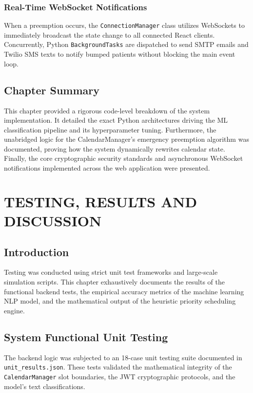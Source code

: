 \documentclass[12pt,a4paper]{report}
\begin{document}
\subsection{Real-Time WebSocket Notifications}
When a preemption occurs, the \texttt{ConnectionManager} class utilizes WebSockets to immediately broadcast the state change to all connected React clients. Concurrently, Python \texttt{BackgroundTasks} are dispatched to send SMTP emails and Twilio SMS texts to notify bumped patients without blocking the main event loop.

\section{Chapter Summary}
This chapter provided a rigorous code-level breakdown of the system implementation. It detailed the exact Python architectures driving the ML classification pipeline and its hyperparameter tuning. Furthermore, the unabridged logic for the CalendarManager's emergency preemption algorithm was documented, proving how the system dynamically rewrites calendar state. Finally, the core cryptographic security standards and asynchronous WebSocket notifications implemented across the web application were presented.

\chapter{TESTING, RESULTS AND DISCUSSION}

\section{Introduction}
Testing was conducted using strict unit test frameworks and large-scale simulation scripts. This chapter exhaustively documents the results of the functional backend tests, the empirical accuracy metrics of the machine learning NLP model, and the mathematical output of the heuristic priority scheduling engine.

\section{System Functional Unit Testing}
The backend logic was subjected to an 18-case unit testing suite documented in \texttt{unit\_results.json}. These tests validated the mathematical integrity of the \texttt{CalendarManager} slot boundaries, the JWT cryptographic protocols, and the model's text classifications.
\end{document}
